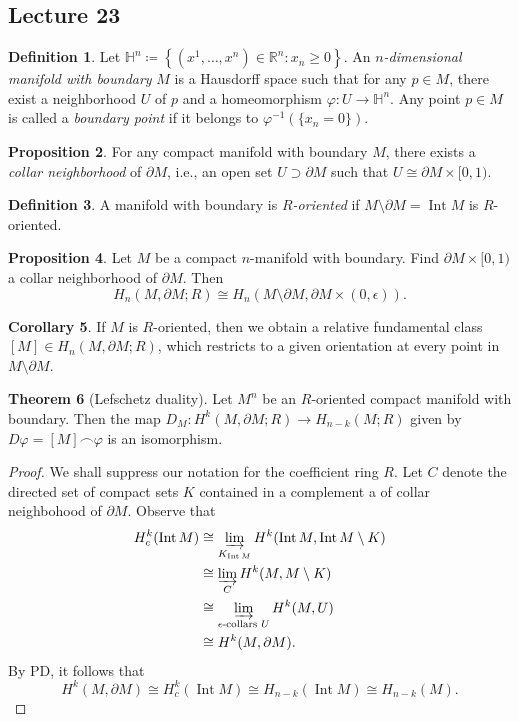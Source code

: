 \documentclass[10pt,letterpaper,cm]{nupset}
\theoremstyle{definition}
\newtheorem{definition}{Definition}[subsection]
\theoremstyle{theorem}
\newtheorem{theorem}[definition]{Theorem}
\newtheorem{prop}[definition]{Proposition}
\newtheorem{corollary}[definition]{Corollary}
\theoremstyle{remark}
\renewcommand{\H}{\mathbb H}
\newcommand{\R}{\mathbb{R}}
\newcommand{\1}{\mathbb{1}}
\newcommand{\0}{\vec 0}
\DeclareMathOperator{\Int}{Int}
\begin{document}
\subsection{Lecture 23}

\begin{definition}
Let $\H^n\coloneqq  \left\{(x^1, \ldots, x^n) \in \R^n : x_n \geq 0\right\}.$ An \textit{$n$-dimensional manifold with boundary} $M$ is a Hausdorff space such that for any $p \in M$, there exist a neighborhood $U$ of $p$ and a homeomorphism $\varphi : U \to \H^n$.  Any point $p\in M$ is called a \textit{boundary point} if it belongs to $\varphi^{-1}( \{x_n = 0\})$.
\end{definition}

\begin{prop} 
For any compact manifold with boundary $M$, there exists a \textit{collar neighborhood} of $\partial{M}$, i.e., an open set $U\supset \partial{M}$ such that $U \cong \partial{M} \times [0,1)$.
\end{prop}

\begin{definition}
A manifold with boundary is \textit{$R$-oriented} if $M \setminus \partial{M} = \Int{M}$ is $R$-oriented.
\end{definition}

\begin{prop} 
Let $M$ be a compact $n$-manifold with boundary. Find $ \partial{M} \times [0,1)$ a collar neighborhood of $\partial{M}$. Then $$  H_n(M, \partial{M}; R) \cong H_n(M \setminus \partial{M}, \partial{M} \times (0, \epsilon))  .$$
\end{prop}

\begin{corollary}
If $M$ is $R$-oriented, then we obtain a relative fundamental class $[M] \in H_n(M, \partial{M}; R)$, which restricts to a given orientation at every point in $M \setminus \partial{M}$.
\end{corollary}

\begin{theorem}[Lefschetz duality]
Let $M^n$ be an $R$-oriented compact manifold with boundary. Then the map $D_M: H^k(M, \partial{M}; R) \to H_{n-k}(M; R)$ given by $D{\varphi} = [M] \frown \varphi$ is an isomorphism. 
\end{theorem}
\begin{proof}
We shall suppress our notation for the coefficient ring $R$. Let $C$ denote the directed set of compact sets $K$ contained in a complement a of collar neighbohood of $\partial{M}$. Observe that
\begin{align*}
H^k_c(\Int{M}) & \cong \varinjlim_{K_{\Int{M}}} H^k(\Int{M}, \Int{M} \setminus K)
\\ & \cong \varinjlim_{C} H^k(M, M \setminus K) 
\\ & \cong \varinjlim_{\epsilon{\text{-collars }}U} H^k(M, U)
\\ & \cong H^k(M, \partial{M}). 
\end{align*}
By PD, it follows that $$H^k(M, \partial{M}) \cong H^k_c(\Int{M}) \cong H_{n-k}(\Int{M}) \cong H_{n-k}(M)  .$$
\end{proof}
\end{document}

